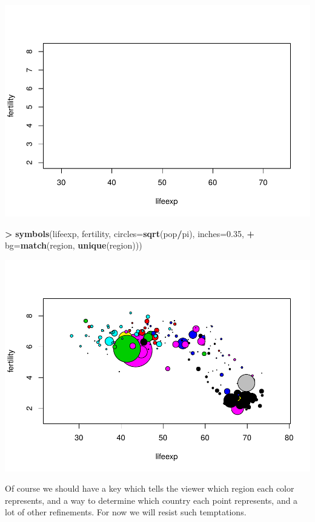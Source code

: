 \documentclass[
]{krantz}
\makeatletter
\newenvironment{Shaded}{\begin{snugshade}}{\end{snugshade}}
\newcommand{\DataTypeTok}[1]{\textcolor[rgb]{0.27,0.27,0.27}{#1}}
\newcommand{\FloatTok}[1]{\textcolor[rgb]{0.06,0.06,0.06}{#1}}
\newcommand{\KeywordTok}[1]{\textcolor[rgb]{0.27,0.27,0.27}{\textbf{#1}}}
\newcommand{\NormalTok}[1]{#1}
\newcommand{\OperatorTok}[1]{\textcolor[rgb]{0.43,0.43,0.43}{\textbf{#1}}}
\newcommand{\StringTok}[1]{\textcolor[rgb]{0.5,0.5,0.5}{#1}}
\newenvironment{kframe}{%
\medskip{}
\setlength{\fboxsep}{.8em}
 \def\at@end@of@kframe{}%
 \ifinner\ifhmode%
  \def\at@end@of@kframe{\end{minipage}}%
  \begin{minipage}{\columnwidth}%
 \fi\fi%
 \def\FrameCommand##1{\hskip\@totalleftmargin \hskip-\fboxsep
 \colorbox{shadecolor}{##1}\hskip-\fboxsep
     \hskip-\linewidth \hskip-\@totalleftmargin \hskip\columnwidth}%
 \MakeFramed {\advance\hsize-\width
   \@totalleftmargin\z@ \linewidth\hsize
   \@setminipage}}%
 {\par\unskip\endMakeFramed%
 \at@end@of@kframe}
\renewenvironment{Shaded}{\begin{kframe}}{\end{kframe}}
\makeatother
\begin{document}
\includegraphics{bookdown_files/figure-latex/unnamed-chunk-15-1.pdf}

\begin{Shaded}
\begin{Highlighting}[]
\OperatorTok{\textgreater{}}\StringTok{ }\KeywordTok{symbols}\NormalTok{(lifeexp, fertility, }\DataTypeTok{circles=}\KeywordTok{sqrt}\NormalTok{(pop}\OperatorTok{/}\NormalTok{pi), }\DataTypeTok{inches=}\FloatTok{0.35}\NormalTok{, }
\OperatorTok{+}\StringTok{         }\DataTypeTok{bg=}\KeywordTok{match}\NormalTok{(region, }\KeywordTok{unique}\NormalTok{(region)))}
\end{Highlighting}
\end{Shaded}

\includegraphics{bookdown_files/figure-latex/unnamed-chunk-15-2.pdf}

Of course we should have a key which tells the viewer which region each color represents, and a way to determine which country each point represents, and a lot of other refinements. For now we will resist such temptations.
\end{document}
